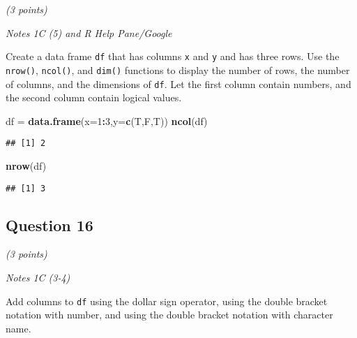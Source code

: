 \documentclass[
]{article}
\newenvironment{Shaded}{\begin{snugshade}}{\end{snugshade}}
\newcommand{\DataTypeTok}[1]{\textcolor[rgb]{0.13,0.29,0.53}{#1}}
\newcommand{\DecValTok}[1]{\textcolor[rgb]{0.00,0.00,0.81}{#1}}
\newcommand{\KeywordTok}[1]{\textcolor[rgb]{0.13,0.29,0.53}{\textbf{#1}}}
\newcommand{\NormalTok}[1]{#1}
\newcommand{\OperatorTok}[1]{\textcolor[rgb]{0.81,0.36,0.00}{\textbf{#1}}}
\newcommand{\StringTok}[1]{\textcolor[rgb]{0.31,0.60,0.02}{#1}}
\begin{document}
\emph{(3 points)}

\emph{Notes 1C (5) and R Help Pane/Google}

Create a data frame \texttt{df} that has columns \texttt{x} and
\texttt{y} and has three rows. Use the \texttt{nrow()}, \texttt{ncol()},
and \texttt{dim()} functions to display the number of rows, the number
of columns, and the dimensions of \texttt{df}. Let the first column
contain numbers, and the second column contain logical values.

\begin{Shaded}
\begin{Highlighting}[]
\NormalTok{df =}\StringTok{ }\KeywordTok{data.frame}\NormalTok{(}\DataTypeTok{x=}\DecValTok{1}\OperatorTok{:}\DecValTok{3}\NormalTok{,}\DataTypeTok{y=}\KeywordTok{c}\NormalTok{(T,F,T))}
\KeywordTok{ncol}\NormalTok{(df)}
\end{Highlighting}
\end{Shaded}

\begin{verbatim}
## [1] 2
\end{verbatim}

\begin{Shaded}
\begin{Highlighting}[]
\KeywordTok{nrow}\NormalTok{(df)}
\end{Highlighting}
\end{Shaded}

\begin{verbatim}
## [1] 3
\end{verbatim}

\hypertarget{question-16}{%
\subsection{Question 16}\label{question-16}}

\emph{(3 points)}

\emph{Notes 1C (3-4)}

Add columns to \texttt{df} using the dollar sign operator, using the
double bracket notation with number, and using the double bracket
notation with character name.

\begin{Shaded}
\end{Shaded}
\end{document}
